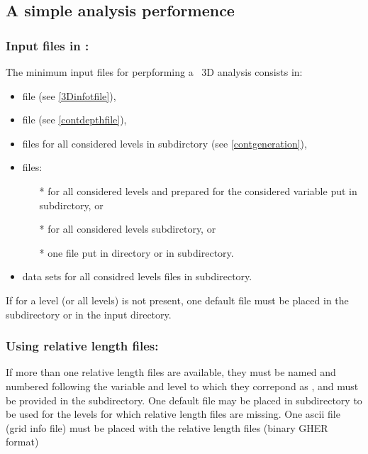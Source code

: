 \subsection{A simple analysis performence}

\subsubsection{ Input files in :}

The minimum input files for perpforming a \diva\ 3D analysis consists in:

\begin{itemize}
\item {} file (see \ref{3Dinfotfile}),
\item {} file (see \ref{contdepthfile}),
\item {} files for all considered levels in  subdirctory (see \ref{contgeneration}),
\item {} files:
\begin{itemize}
\item[*]  for all considered levels and prepared for the considered variable put in  subdirctory, or
\item[*]  for all considered levels  subdirctory, or
\item[*] one  file put in   directory or in  subdirectory.
\end{itemize}
\item data sets for all considred levels  files in   subdirectory.
\end{itemize}


\btips
 If for a level (or all levels)  is not present, one default   file must be placed in the  subdirectory or in the input directory.
\etips

\subsubsection{ Using relative length files:}

If more than one relative length files are available, they must be  named and numbered following the variable and level to which they correpond as , and must be provided in the  subdirectory. One default file  may be placed in   subdirectory to be used for the levels for which relative length files are missing. One  ascii file (grid info file) must be placed with the relative length files (binary GHER format)


